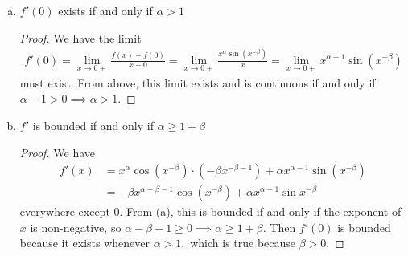 \documentclass{article}
\begin{document}
\begin{itemize}
\begin{enumerate}[(a)]
			\item $f'(0)$ exists if and only if $\alpha>1$
				\begin{proof}
					We have the limit
					\begin{align*}
						f'(0)=\lim_{x\to 0+} \frac{f(x)-f(0)}{x-0} = \lim_{x\to0+} \frac{x^\alpha\sin(x^{-\beta})}{x} = \lim_{x\to0+} x^{\alpha-1}\sin(x^{-\beta})
					\end{align*}
					must exist. From above, this limit exists and is continuous if and only if $\alpha-1>0\implies \alpha>1.$

				\end{proof}

			\item $f'$ is bounded if and only if $\alpha\ge 1+\beta$
				\begin{proof}
					We have 
					\begin{align*}
						f'(x)&=x^\alpha\cos(x^{-\beta})\cdot (-\beta x^{-\beta-1}) + \alpha x^{\alpha-1}\sin(x^{-\beta}) \\
						&= -\beta x^{\alpha-\beta-1}\cos (x^{-\beta}) + \alpha x^{\alpha-1}\sin x^{-\beta}
					\end{align*}
					everywhere except 0. From (a), this is bounded if and only if the exponent of $x$ is non-negative, so $\alpha-\beta-1\ge 0\implies \alpha \ge 1+\beta.$ Then $f'(0)$ is bounded because it exists whenever $\alpha>1,$ which is true because $\beta>0.$
				\end{proof}


\end{enumerate}
\end{itemize}
\end{document}
